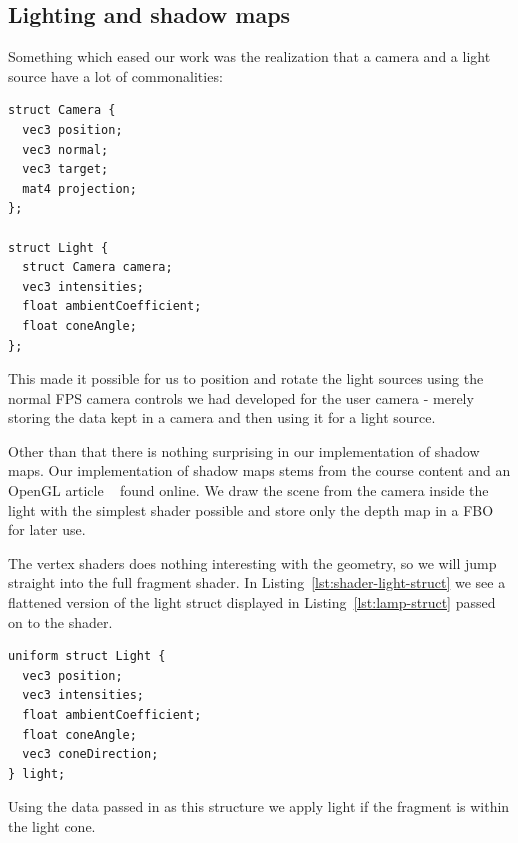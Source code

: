 \documentclass[a4paper,12pt]{article}
\begin{document}
\subsection{Lighting and shadow maps}

Something which eased our work was the realization that a camera and a light source have a lot of commonalities:

\begin{lstlisting}[label=lst:lamp-struct,caption=Light source struct]
struct Camera {
  vec3 position;
  vec3 normal;
  vec3 target;
  mat4 projection;
};

struct Light {
  struct Camera camera;
  vec3 intensities;
  float ambientCoefficient;
  float coneAngle;
};
\end{lstlisting}

This made it possible for us to position and rotate the light sources using the normal FPS camera controls we had developed for the user camera - merely storing the data kept in a camera and then using it for a light source.

Other than that there is nothing surprising in our implementation of shadow maps. Our implementation of shadow maps stems from the course content and an OpenGL article ~\cite{shadow-maps-tutorial} found online. We draw the scene from the camera inside the light with the simplest shader possible and store only the depth map in a FBO for later use.

The vertex shaders does nothing interesting with the geometry, so we will jump straight into the full fragment shader. In Listing~\ref{lst:shader-light-struct} we see a flattened version of the light struct displayed in Listing~\ref{lst:lamp-struct} passed on to the shader.

\begin{lstlisting}[label=lst:shader-light-struct,caption= The light struct received in the shader.]
uniform struct Light {
  vec3 position;
  vec3 intensities;
  float ambientCoefficient;
  float coneAngle;
  vec3 coneDirection;
} light;
\end{lstlisting}

Using the data passed in as this structure we apply light if the fragment is within the light cone.
\end{document}
